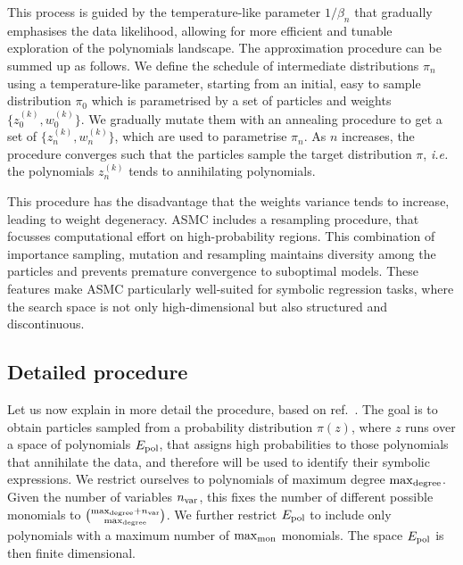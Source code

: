 \documentclass[11pt,a4paper]{article}
\begin{document}
	This process is guided by the temperature-like parameter $1/\beta_{n}$ that gradually emphasises the data likelihood, allowing for more efficient and tunable exploration of the polynomials landscape. The approximation procedure can be summed up as follows. We define the schedule of intermediate distributions $\pi_{n}$ using a temperature-like parameter, starting from an initial, easy to sample distribution $\pi_0$ which is parametrised by a set of particles and weights $\big\{z_0^{(k)},w_0^{(k)}\big\}$. We gradually mutate them with an annealing procedure to get a set of $\{z_n^{(k)},w_n^{(k)}\}$, which are used to parametrise $\pi_n$. As $n$ increases, the procedure converges such that the particles sample the target distribution $\pi$, \textit{i.e.} the polynomials $z_n^{(k)}$ tends to annihilating polynomials.
	
	This procedure has the disadvantage that the weights variance tends to increase, leading to weight degeneracy. ASMC includes a resampling procedure, that focusses computational effort on high-probability regions.  This combination of importance sampling, mutation and resampling maintains diversity among the particles and prevents premature convergence to suboptimal models. These features make ASMC particularly well-suited for symbolic regression tasks, where the search space is not only high-dimensional but also structured and discontinuous.

	\subsection{Detailed procedure}	\label{sec:detailedAISSMC}
	
	
	Let us now explain in more detail the procedure, based on ref.~\cite{del2006sequential,DoucetTutorial,naesseth2024elementssequentialmontecarlo,Dai03072022}. 
	The goal is to obtain particles sampled from a probability distribution $\pi(z)$, where $z$ runs over a space of polynomials $E_{\rm pol}$, that assigns high probabilities to those polynomials that annihilate the data, and therefore will be used to identify their symbolic expressions. We restrict ourselves to polynomials of maximum degree ${\rm max}_{\rm degree}$. Given the number of variables $n_{\rm var}$, this fixes the number of different possible monomials to $\binom{{\rm max}_{\rm degree}+n_{\rm var}}{{\rm max}_{\rm degree}}$. We further restrict $E_{\rm pol}$ to include only polynomials with a maximum number of ${\rm max}_{\rm mon}$ monomials. The space $E_{\rm pol}$ is then finite dimensional.
\end{document}
